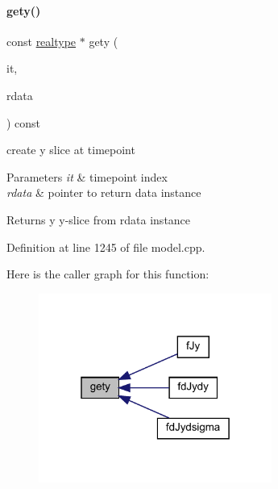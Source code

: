 \paragraph{\texorpdfstring{gety()}{gety()}}
{\footnotesize\ttfamily const \mbox{\hyperlink{namespaceamici_a1bdce28051d6a53868f7ccbf5f2c14a3}{realtype}} $\ast$ gety (\begin{DoxyParamCaption}\item[{const int}]{it,  }\item[{const \mbox{\hyperlink{classamici_1_1_return_data}{Return\+Data}} $\ast$}]{rdata }\end{DoxyParamCaption}) const\hspace{0.3cm}{\ttfamily [protected]}}

create y slice at timepoint 
\begin{DoxyParams}{Parameters}
{\em it} & timepoint index \\
\hline
{\em rdata} & pointer to return data instance \\
\hline
\end{DoxyParams}
\begin{DoxyReturn}{Returns}
y y-\/slice from rdata instance 
\end{DoxyReturn}


Definition at line 1245 of file model.\+cpp.

Here is the caller graph for this function\+:
\nopagebreak
\begin{figure}[H]
\begin{center}
\leavevmode
\includegraphics[width=217pt]{classamici_1_1_model_aee6c7b534a091180c01aabb3be44a216_icgraph}
\end{center}
\end{figure}
\mbox{\label{classamici_1_1_model_abefad4b8b4ba76bad66f57504affca9b}} 
